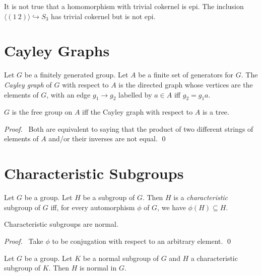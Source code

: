 \begin{ex}
It is not true that a homomorphism with trivial cokernel is epi. The inclusion $\langle (1\ 2) \rangle \hookrightarrow S_3$ has trivial cokernel but is not epi.
\end{ex}

\section{Cayley Graphs}

\begin{df}
Let $G$ be a finitely generated group. Let $A$ be a finite set of generators for $G$. The \emph{Cayley graph} of $G$ with respect to $A$ is the directed graph whose vertices are the elements of $G$, with an edge $g_1 \rightarrow g_2$ labelled by $a \in A$ iff $g_2 = g_1 a$.
\end{df}

\begin{prop}
$G$ is the free group on $A$ iff the Cayley graph with respect to $A$ is a tree.
\end{prop}

\begin{proof}
\pf\ Both are equivalent to saying that the product of two different strings of elements of $A$ and/or their inverses are not equal. \qed
\end{proof}

\section{Characteristic Subgroups}

\begin{df}
Let $G$ be a group. Let $H$ be a subgroup of $G$. Then $H$ is a \emph{characteristic} subgroup of $G$ iff, for every automorphism $\phi$ of $G$, we have $\phi(H) \subseteq H$.
\end{df}

\begin{prop}
Characteristic subgroups are normal.
\end{prop}

\begin{proof}
\pf\ Take $\phi$ to be conjugation with respect to an arbitrary element. \qed
\end{proof}

\begin{prop}
Let $G$ be a group. Let $K$ be a normal subgroup of $G$ and $H$ a characteristic subgroup of $K$. Then $H$ is normal in $G$.
\end{prop}

